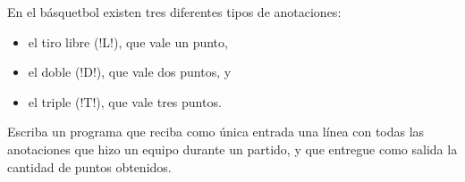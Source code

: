 En el básquetbol existen tres diferentes tipos de anotaciones:
\begin{itemize}
  \item el tiro libre (\li!L!), que vale un punto,
  \item el doble (\li!D!), que vale dos puntos, y
  \item el triple (\li!T!), que vale tres puntos.
\end{itemize}

Escriba un programa que reciba como única entrada
una línea con todas las anotaciones que hizo un equipo durante un partido,
y que entregue como salida la cantidad de puntos obtenidos.

\begin{minipage}[t]{.50\textwidth}
  
\end{minipage}
